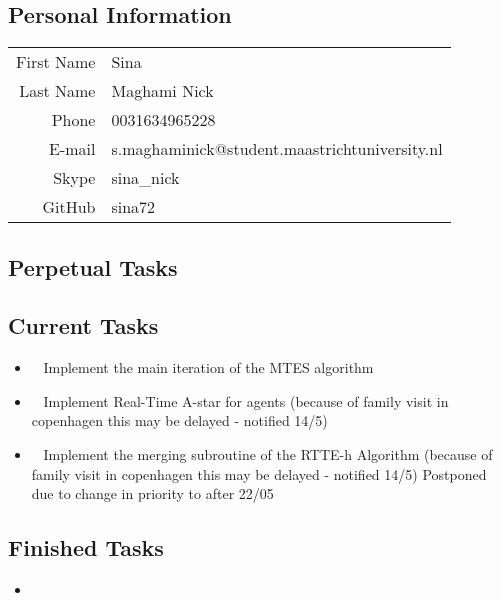 \subsection{Personal Information}
\begin{table}[h!]
	\begin{tabular}{rl}
	First Name 	& Sina\\
	Last Name	& Maghami Nick\\
	Phone		& 0031634965228\\
	E-mail		& s.maghaminick@student.maastrichtuniversity.nl\\
	Skype		& sina\_nick\\
	GitHub		& sina72
\end{tabular}
\end{table}

\subsection{Perpetual Tasks}

\subsection{Current Tasks}
\begin{itemize}
	\item~
	Implement the main iteration of the MTES algorithm
	\item~
	Implement Real-Time A-star for agents
		\subitem (because of family visit in copenhagen this may be delayed - notified 14/5)
	\item~
	Implement the merging subroutine of the RTTE-h Algorithm
		\subitem (because of family visit in copenhagen this may be delayed - notified 14/5)
		\subitem Postponed due to change in priority to after 22/05
\end{itemize}

\subsection{Finished Tasks}
\begin{itemize}
	\item 
\end{itemize}
